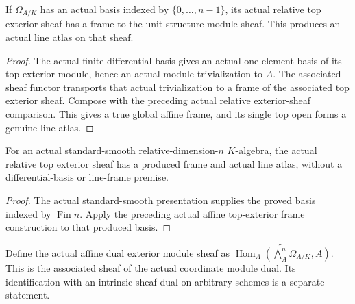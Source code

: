 \begin{theorem}
\label{sc0-canonical-port:ext:actual-affine-top-exterior-frame}
\leanok
If \(\Omega_{A/K}\) has an actual basis indexed
by \(\{0,\ldots,n-1\}\), its actual relative top
exterior sheaf has a frame to the unit structure-module
sheaf. This produces an actual line atlas on that sheaf.
\end{theorem}
\begin{proof}
The actual finite differential basis gives an actual
one-element basis of its top exterior module, hence
an actual module trivialization to \(A\).
The associated-sheaf functor transports that actual
trivialization to a frame of the associated top
exterior sheaf. Compose with the preceding actual
relative exterior-sheaf comparison. This gives a
true global affine frame, and its single top open
forms a genuine line atlas.
\end{proof}

\begin{corollary}
\label{sc0-canonical-port:ext:standard-smooth-actual-top-exterior-frame}
\leanok
For an actual standard-smooth relative-dimension-\(n\)
\(K\)-algebra, the actual relative top exterior sheaf
has a produced frame and actual line atlas, without
a differential-basis or line-frame premise.
\end{corollary}
\begin{proof}
The actual standard-smooth presentation supplies the
proved basis indexed by \(\operatorname{Fin}n\).
Apply the preceding actual affine top-exterior frame
construction to that produced basis.
\end{proof}

\begin{definition}
\label{sc0-canonical-port:ext:actual-affine-dual-exterior-module-sheaf}
\leanok
Define the actual affine dual exterior module sheaf as
\(\widetilde{\operatorname{Hom}_A(\bigwedge_A^n\Omega_{A/K},A)}\).
This is the associated sheaf of the actual coordinate
module dual. Its identification with an intrinsic
sheaf dual on arbitrary schemes is a separate statement.
\end{definition}

